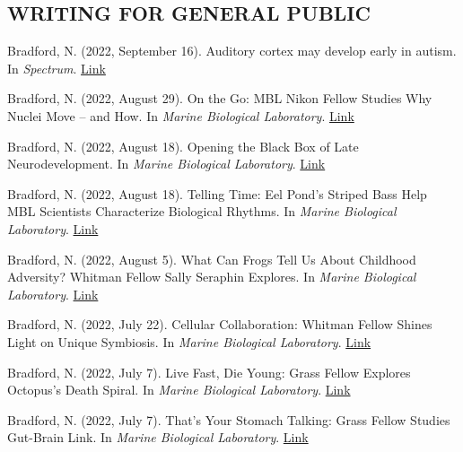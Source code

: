 \documentclass[margin, 10pt]{res} %
\begin{document}
\begin{resume}

\section{WRITING FOR GENERAL PUBLIC}

Bradford, N. (2022, September 16). Auditory cortex may develop early in autism. In {\sl Spectrum}. \href{https://www.spectrumnews.org/news/auditory-cortex-may-develop-early-in-autism/}{Link}

Bradford, N. (2022, August 29). On the Go: MBL Nikon Fellow Studies Why Nuclei Move – and How. In {\sl Marine Biological Laboratory}. \href{https://www.mbl.edu/news/go-mbl-nikon-fellow-studies-why-nuclei-move-and-how}{Link}

Bradford, N. (2022, August 18). Opening the Black Box of Late Neurodevelopment. In {\sl Marine Biological Laboratory}. \href{https://www.mbl.edu/news/opening-black-box-late-neurodevelopment}{Link}

Bradford, N. (2022, August 18). Telling Time: Eel Pond’s Striped Bass Help MBL Scientists Characterize Biological Rhythms. In {\sl Marine Biological Laboratory}. \href{https://www.mbl.edu/news/telling-time-eel-ponds-striped-bass-help-mbl-scientists-characterize-biological-rhythms}{Link}

Bradford, N. (2022, August 5). What Can Frogs Tell Us About Childhood Adversity? Whitman Fellow Sally Seraphin Explores. In {\sl Marine Biological Laboratory}. \href{https://www.mbl.edu/news/what-can-frogs-tell-us-about-childhood-adversity-whitman-fellow-sally-seraphin-explores}{Link}

Bradford, N. (2022, July 22). Cellular Collaboration: Whitman Fellow Shines Light on Unique Symbiosis. In {\sl Marine Biological Laboratory}. \href{https://www.mbl.edu/news/cellular-collaboration-whitman-fellow-shines-light-unique-symbiosis}{Link}

Bradford, N. (2022, July 7). Live Fast, Die Young: Grass Fellow Explores Octopus's Death Spiral. In {\sl Marine Biological Laboratory}. \href{https://www.mbl.edu/news/live-fast-die-young-grass-fellow-explores-octopuss-death-spiral}{Link}

Bradford, N. (2022, July 7). That’s Your Stomach Talking: Grass Fellow Studies Gut-Brain Link. In {\sl Marine Biological Laboratory}. \href{https://www.mbl.edu/news/thats-your-stomach-talking-grass-fellow-studies-gut-brain-link}{Link}


\end{resume}
\end{document}
